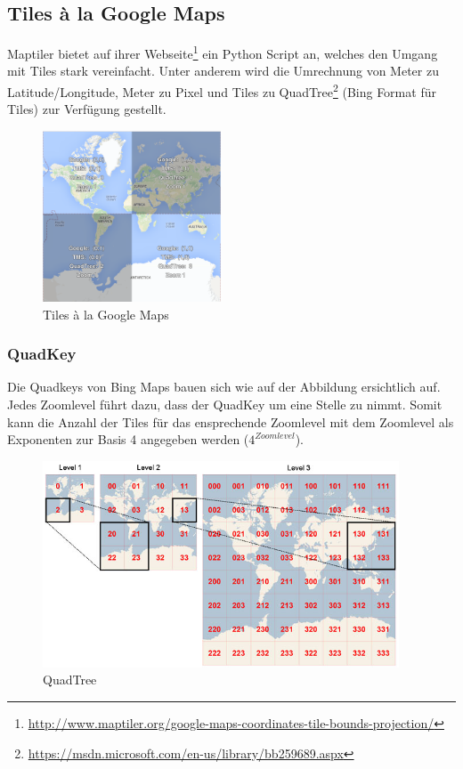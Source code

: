 \subsection{Tiles à la Google Maps}
\label{subsec:tiles}
Maptiler bietet auf ihrer Webseite\footnote{\url{http://www.maptiler.org/google-maps-coordinates-tile-bounds-projection/}} ein Python Script an, welches den Umgang mit Tiles stark vereinfacht. Unter anderem wird die Umrechnung von Meter zu Latitude/Longitude, Meter zu Pixel und Tiles zu QuadTree\footnote{\url{https://msdn.microsoft.com/en-us/library/bb259689.aspx}} (Bing Format für Tiles) zur Verfügung gestellt.\\

\begin{figure}[H]
\centering
\includegraphics[width=150pt]{images/tiles_a_la_google.png}
\caption[Tiles à la Google Maps]{Tiles à la Google Maps}
\end{figure}

\subsubsection{QuadKey}
Die Quadkeys von Bing Maps bauen sich wie auf der Abbildung ersichtlich auf. Jedes Zoomlevel führt dazu, dass der QuadKey um eine Stelle zu nimmt. Somit kann die Anzahl der Tiles für das ensprechende Zoomlevel mit dem Zoomlevel als Exponenten zur Basis 4 angegeben werden ($4^{Zoomlevel}$).  \\
\begin{figure}[H]
\centering
\includegraphics[width=300pt]{images/quadkey.png}
\caption[QuadTree]{QuadTree}
\end{figure}
\newpage
